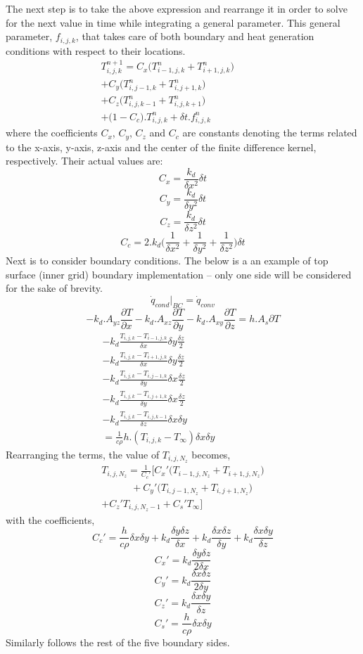 \documentclass[a4paper,10pt]{IEEEtran}
\begin{document}
	The next step is to take the above expression and rearrange it in order to solve for the next value in time while integrating a general parameter. This general parameter, $f_{i,j,k}$, that takes care of both boundary and heat generation conditions with respect to their locations. 
	\begin{multline}
		T_{i,j,k}^{n+1} = C_x\Big( T_{i-1,j,k}^n+T_{i+1,j,k}^n \Big)\\ 
		+ C_y \Big( T_{i,j-1,k}^n+T_{i,j+1,k}^n \Big) \qquad \qquad \qquad \\
		 + C_z \Big( T_{i,j,k-1}^n+T_{i,j,k+1}^n \Big)\\ 
		+ \Big( 1 - C_c \Big).T_{i,j,k}^n + \delta t.f_{i,j,k}^n \quad
	\end{multline}
	where the coefficients $C_x$, $C_y$, $C_z$ and $C_c$ are constants denoting the terms related to the x-axis, y-axis, z-axis and the center of the finite difference kernel, respectively. Their actual values are:
	$$C_x = \frac{k_d}{\delta x^2} \delta t$$
	$$C_y =  \frac{k_d}{\delta y^2} \delta t$$
	$$C_z = \frac{k_d}{\delta z^2} \delta t$$
	$$C_c = 2.k_d\Big( \frac{1}{\delta x^2}+\frac{1}{\delta y^2}+\frac{1}{\delta z^2} \Big)\delta t$$
	Next is to consider boundary conditions. The below is a an example of top surface (inner grid) boundary implementation -- only one side will be considered for the sake of brevity. 
	$$\dot{q}_{cond}\Big |_{BC} = \dot{q}_{conv}$$
	$$-k_d.A_{yz} \frac{\partial T}{\partial x} -k_d.A_{xz} \frac{\partial T}{\partial y} - k_d.A_{xy} \frac{\partial T}{\partial z} = h.A_s\partial T $$
	\begin{multline}
	-k_d \frac{T_{i,j,k}-T_{i-1,j,k}}{\delta x}\delta y \frac{\delta z}{2}\\
	-k_d \frac{T_{i,j,k}-T_{i+1,j,k}}{\delta x}\delta y \frac{\delta z}{2} \qquad \qquad \qquad \qquad\\
	-k_d \frac{T_{i,j,k}-T_{i,j-1,k}}{\delta y}\delta x \frac{\delta z}{2} \qquad \qquad \qquad\\
	-k_d \frac{T_{i,j,k}-T_{i,j+1,k}}{\delta y}\delta x \frac{\delta z}{2} \qquad \qquad \\
	-k_d \frac{T_{i,j,k}-T_{i,j,k-1}}{\delta z}\delta x \delta y \qquad \\
	 = \frac{1}{c\rho}h.( T_{i,j,k}-T_{\infty})\delta x \delta y \quad \qquad
	\end{multline}
	Rearranging the terms, the value of $T_{i,j,N_z}$ becomes,
	\begin{multline}
	T_{i,j,N_z} = \frac{1}{C_c'}\Big[ C_x'\Big(T_{i-1,j,N_z}+T_{i+1,j,N_z}\Big)\\
	\qquad \quad+C_y'\Big(T_{i,j-1,N_z}+T_{i,j+1,N_z} \Big)\\
	+C_z'T_{i,j,N_z-1}+C_s'T_{\infty}\Big] 
	\end{multline}
	with the coefficients, 
	$$C_c'=\frac{h}{c\rho}\delta x \delta y + k_d \frac{\delta y \delta z}{\delta x} + k_d \frac{\delta x \delta z}{\delta y} + k_d \frac{\delta x \delta y}{\delta z}  $$
	$$C_x'=k_d \frac{\delta y \delta z}{2\delta x} $$ 
	$$C_y'=k_d \frac{\delta x \delta z}{2\delta y} $$
	$$C_z'=k_d \frac{\delta x \delta y}{\delta z} $$
	$$C_s'= \frac{h}{c\rho}\delta x \delta y $$ 
	Similarly follows the rest of the five boundary sides.
	
\end{document}
